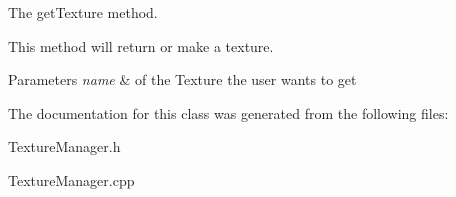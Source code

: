 The get\+Texture method. 

This method will return or make a texture. 
\begin{DoxyParams}{Parameters}
{\em name} & of the Texture the user wants to get \\
\hline
\end{DoxyParams}


The documentation for this class was generated from the following files\+:\begin{DoxyCompactItemize}
\item 
Texture\+Manager.\+h\item 
Texture\+Manager.\+cpp\end{DoxyCompactItemize}
